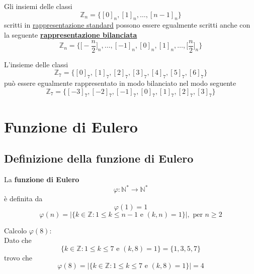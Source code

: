 \documentclass[a4paper,12pt, oneside]{book}
\begin{document}
		\begin{nota}
			Gli insiemi delle classi
			$$\mathbb{Z}_n = \{ [0]_n, [1]_n, \dots, [n-1]_n \}$$
			scritti in \underline{rappresentazione standard} possono essere egualmente scritti anche con la seguente \underline{\textbf{rappresentazione bilanciata}}
			$$\mathbb{Z}_n = \{ \Big[-\frac{n}{2}\Big]_n, \dots, [-1]_n, [0]_n, [1]_n, \dots, \Big[\frac{n}{2}\Big]_n \}$$
			\begin{shaded}
				\begin{esempio}
					L'insieme delle classi
					$$\mathbb{Z}_7 = \{ [0]_7, [1]_7, [2]_7, [3]_7, [4]_7, [5]_7, [6]_7 \}$$
					può essere egualmente rappresentato in modo bilanciato nel modo seguente
					$$\mathbb{Z}_7 = \{ [-3]_7, [-2]_7, [-1]_7, [0]_7, [1]_7, [2]_7, [3]_7 \}$$
				\end{esempio}
			\end{shaded}
		\end{nota}
		
\chapter{Funzione di Eulero}
	\section{Definizione della funzione di Eulero}
		\begin{definizione}
			La \textbf{funzione di Eulero} $$\varphi: \mathbb{N}^* \rightarrow \mathbb{N}^*$$ è definita da\\
			$$\varphi(1)=1$$
			$$\varphi(n)=|\{ k \in \mathbb{Z} : 1 \leq k \leq n-1 \mbox{ e } (k,n)=1  \}|,\mbox{ per } n \geq 2$$
		\end{definizione}
		\begin{esempio}
			Calcolo $\varphi(8)$:\\
			Dato che $$\{ k \in \mathbb{Z} : 1 \leq k \leq 7 \mbox{ e } (k,8)=1 \} = \{ 1,3,5,7 \}$$
			trovo che 
			$$\varphi(8)=|\{ k \in \mathbb{Z} : 1 \leq k \leq 7 \mbox{ e } (k,8)=1  \}| = 4$$
		\end{esempio}
		
\end{document}
